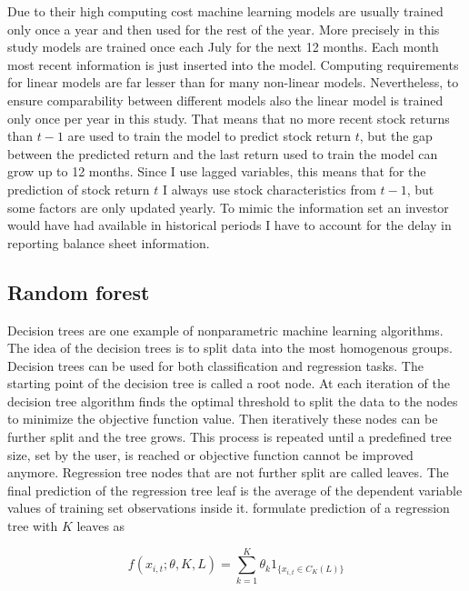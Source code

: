 \documentclass[12pt]{article}
\begin{document}
Due to their high computing cost machine learning models are usually trained only once a year and then used for the rest of the year. More precisely in this study models are trained once each July for the next 12 months. Each month most recent information is just inserted into the model. Computing requirements for linear models are far lesser than for many non-linear models. Nevertheless, to ensure comparability between different models also the linear model is trained only once per year in this study. That means that no more recent stock returns than $t-1$ are used to train the model to predict stock return $t$, but the gap between the predicted return and the last return used to train the model can grow up to 12 months. Since I use lagged variables, this means that for the prediction of stock return $t$ I always use stock characteristics from $t-1$, but some factors are only updated yearly. To mimic the information set an investor would have had available in historical periods I have to account for the delay in reporting balance sheet information. \par

\subsection{Random forest}

Decision trees are one example of nonparametric machine learning algorithms. The idea of the decision trees is to split data into the most homogenous groups. Decision trees can be used for both classification and regression tasks. The starting point of the decision tree is called a root node. At each iteration of the decision tree algorithm finds the optimal threshold to split the data to the nodes to minimize the objective function value. Then iteratively these nodes can be further split and the tree grows. This process is repeated until a predefined tree size, set by the user, is reached or objective function cannot be improved anymore. Regression tree nodes that are not further split are called leaves. The final prediction of the regression tree leaf is the average of the dependent variable values of training set observations inside it. \citet{guetal} formulate prediction of a regression tree with $K$ leaves as \par

\begin{equation}
f(x_{i, t}; \theta, K, L) = \sum_{k=1}^K \theta_k 1 _{\{x_{i, t} \in C_K(L)\}}
\end{equation}
\end{document}
